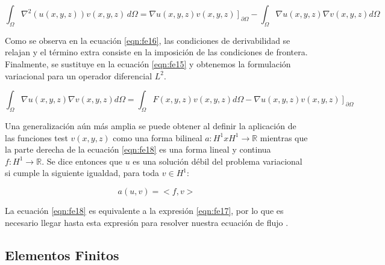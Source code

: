 \begin{equation}
\label{eqn:fe17}
 \displaystyle\int_{\Omega}^{}{\nabla}^{2}(u(x,y,z))v(x,y,z)\, d\Omega = \left. \nabla{u(x,y,z)}v(x,y,z)\right]_{\partial{\Omega}}-\displaystyle\int_{\Omega}^{} {\nabla}u(x,y,z){\nabla}v(x,y,z)d\Omega 
\end{equation}

Como se observa en la ecuación \ref{eqn:fe16}, las condiciones de derivabilidad se relajan y el término extra consiste en la imposición de las condiciones de frontera. Finalmente, se sustituye en la ecuación \ref{eqn:fe15} y obtenemos la formulación variacional para un operador diferencial $L^{2}$.

\begin{equation}
\label{eqn:fe18a}
  \displaystyle\int_{\Omega}^{} {\nabla}u(x,y,z){\nabla}v(x,y,z)d\Omega   = \displaystyle\int_{\Omega}^{} F(x,y,z)v(x,y,z)d\Omega  - \left. \nabla{u(x,y,z)}v(x,y,z)\right]_{\partial{\Omega}} 
\end{equation}

Una generalización aún más amplia se puede obtener al definir la aplicación de las funciones test $v(x,y,z)$ como una forma bilineal $a:H^{1}xH^{1}{\to}\mathbb{R}$  mientras que la parte derecha de la ecuación \ref{eqn:fe18} es una forma lineal y continua $f:H^{1}{\to}\mathbb{R}$. Se dice entonces que $u$ es una solución débil del problema variacional si cumple la siguiente igualdad, para toda $v{\in}H^{1}$:

\begin{equation}
\label{eqn:fe18}
  a(u,v)=<f,v>
\end{equation}

La ecuación \ref{eqn:fe18} es equivalente a la expresión \ref{eqn:fe17}, por lo que es necesario llegar hasta esta expresión para resolver nuestra ecuación de flujo \cite{Esparza}.

\subsection{Elementos Finitos}

